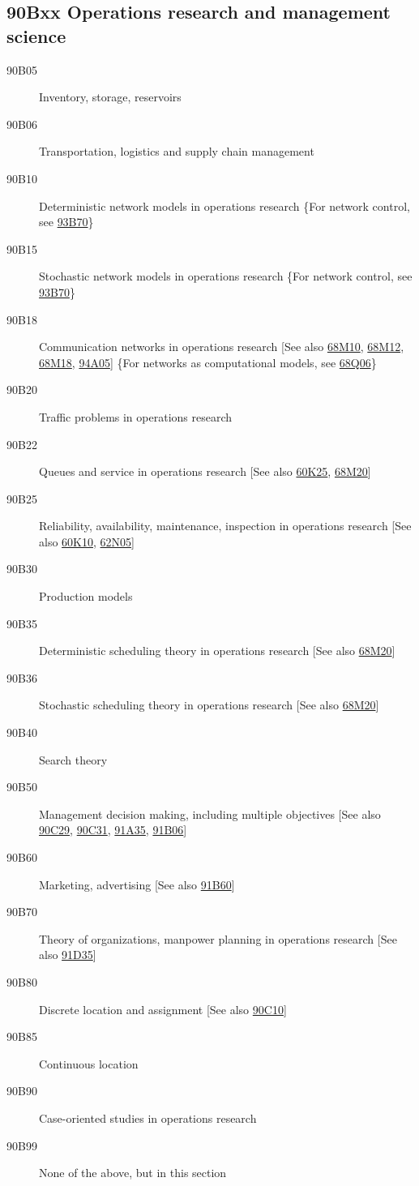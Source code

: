 \documentclass[letterpaper]{article}
\begin{document}
\subsection*{90Bxx  Operations research and management science }\label{90Bxx}
\begin{description}  
\item [90B05]\label{90B05} Inventory, storage, reservoirs
\item [90B06]\label{90B06} Transportation, logistics and supply chain management 
\item [90B10]\label{90B10} Deterministic network models in operations research \{For network control, see \hyperref[93B70]{93B70}\}
\item [90B15]\label{90B15} Stochastic network models in operations research \{For network control, see \hyperref[93B70]{93B70}\}
\item [90B18]\label{90B18} Communication networks in operations research [See also \hyperref[68M10]{68M10}, \hyperref[68M12]{68M12}, \hyperref[68M18]{68M18}, \hyperref[94A05]{94A05}] \{For networks as computational models, see \hyperref[68Q06]{68Q06}\}
\item [90B20]\label{90B20} Traffic problems in operations research
\item [90B22]\label{90B22} Queues and service in operations research [See also \hyperref[60K25]{60K25}, \hyperref[68M20]{68M20}]
\item [90B25]\label{90B25} Reliability, availability, maintenance, inspection in operations research [See also \hyperref[60K10]{60K10}, \hyperref[62N05]{62N05}]
\item [90B30]\label{90B30} Production models
\item [90B35]\label{90B35} Deterministic scheduling theory in operations research [See also \hyperref[68M20]{68M20}]
\item [90B36]\label{90B36} Stochastic scheduling theory in operations research [See also \hyperref[68M20]{68M20}]
\item [90B40]\label{90B40} Search theory
\item [90B50]\label{90B50} Management decision making, including multiple objectives [See also \hyperref[90C29]{90C29}, \hyperref[90C31]{90C31}, \hyperref[91A35]{91A35}, \hyperref[91B06]{91B06}]
\item [90B60]\label{90B60} Marketing, advertising [See also \hyperref[91B60]{91B60}]
\item [90B70]\label{90B70} Theory of organizations, manpower planning in operations research [See also \hyperref[91D35]{91D35}]
\item [90B80]\label{90B80} Discrete location and assignment [See also \hyperref[90C10]{90C10}]
\item [90B85]\label{90B85} Continuous location
\item [90B90]\label{90B90} Case-oriented studies in operations research
\item [90B99]\label{90B99} None of the above, but in this section
\end{description}
\end{document}

